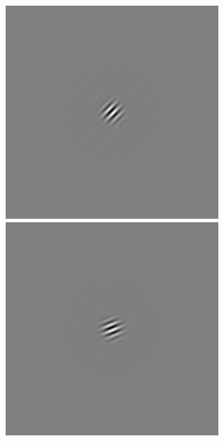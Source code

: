 \begin{figure}[ht]
\begin{center}
 \includegraphics[width=\columnwidth/9]{ch4/figures/rGabor1_2.jpg}
 \includegraphics[width=\columnwidth/9]{ch4/figures/rGabor1_3.jpg}

\end{center}
\end{figure}
